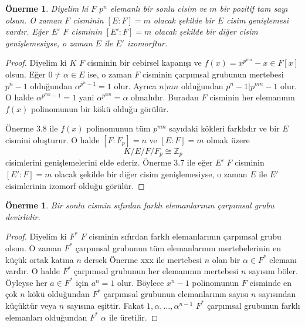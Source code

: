 \documentclass[draft]{article}
\newtheorem{prop}[thm]{Önerme}
\theoremstyle{definition}
\theoremstyle{remark}
\begin{document}
    	    \begin{prop}
    	        Diyelim ki $F$ $p^n$ elemanlı bir sonlu cisim ve $m$ bir pozitif tam sayı olsun. O zaman $F$ cisminin $[E : F] = m$ olacak şekilde bir $E$ cisim genişlemesi vardır. Eğer $E'$ $F$ cisminin $[E' : F] = m$ olacak şekilde bir diğer cisim genişlemesiyse, o zaman $E$ ile $E'$ izomorftur.
    	    \end{prop}
    	    
    	    \begin{proof}
    	        Diyelim ki $K$ $F$ cisminin bir cebirsel kapanışı ve $f(x) = x^{p^{mn}} - x \in F[x]$ olsun. Eğer $0 \neq \alpha \in E$ ise, o zaman $F$ cisminin çarpımsal grubunun mertebesi $p^n - 1$ olduğundan $\alpha^{p^n - 1} = 1$ olur. Ayrıca $n | mn$ olduğundan $p^n - 1 | p^{mn} - 1$ olur. O halde $\alpha^{p^{mn} - 1} = 1$ yani $\alpha^{p^{mn}} = \alpha$ olmalıdır. Buradan $F$ cisminin her elemanının $f(x)$ polinomunun bir kökü olduğu görülür.\par
    	        Önerme 3.8 ile $f(x)$ polinomunun tüm $p^{mn}$ sayıdaki kökleri farklıdır ve bir $E$ cismini oluşturur. O halde $[F : F_p] = n$ ve $[E : F] = m$ olmak üzere
    	        \begin{equation*}
    	            K / E / F / F_p \cong \mathbb{Z}_p
    	        \end{equation*}
    	        cisimlerini genişlemelerini elde ederiz. Önerme 3.7 ile eğer $E'$ $F$ cisminin $[E' : F] = m$ olacak şekilde bir diğer cisim genişlemesiyse, o zaman $E$ ile $E'$ cisimlerinin izomorf olduğu görülür.
    	    \end{proof}
    	    
    	    \begin{prop}
    	        Bir sonlu cismin sıfırdan farklı elemanlarının çarpımsal grubu devirlidir.
    	    \end{prop}
    	    
    	    \begin{proof}
    	        Diyelim ki $F^*$ $F$ cisminin sıfırdan farklı elemanlarının çarpımsal grubu olsun. O zaman $F^*$ çarpımsal grubunun tüm elemanlarının mertebelerinin en küçük ortak katına $n$ dersek Önerme xxx ile mertebesi $n$ olan bir $\alpha \in F^*$ elemanı vardır. O halde $F^*$ çarpımsal grubunun her elemanının mertebesi $n$ sayısını böler. Öyleyse her $a \in F^*$ için $a^n = 1$ olur. Böylece $x^n - 1$ polinomunun $F$ cisminde en çok $n$ kökü olduğundan $F^*$ çarpımsal grubunun elemanlarının sayısı $n$ sayısından küçüktür veya $n$ sayısına eşittir. Fakat $1, \alpha, \dots, \alpha^{n - 1}$ $F^*$ çarpımsal grubunun farklı elemanları olduğundan $F^*$ $\alpha$ ile üretilir.
    	    \end{proof}
    	    
\end{document}
